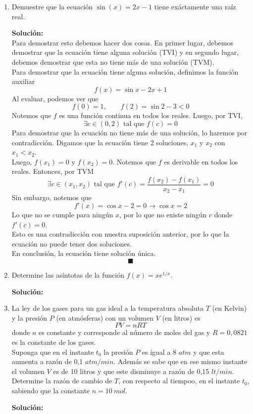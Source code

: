 \documentclass[12pt]{article}
\newenvironment{solucion}
{\begin{mdframed}[backgroundcolor=black!10]
		{\bf Solución:}\\
	}
	{
	\end{mdframed}
}
\newenvironment{preguntas}
{\begin{enumerate}\itemsep12pt
	}
	{
	\end{enumerate}
}
\newcommand{\ra}{\rightarrow}
\begin{document}
\begin{preguntas}
\begin{solucion}
\end{solucion}
\item Demuestre que la ecuación $\sin (x) = 2x-1$ tiene exáctamente una raíz real.
\begin{solucion}
Para demostrar esto debemos hacer dos cosas. En primer lugar, debemos demostrar que la ecuación tiene alguna solución (TVI) y en segundo lugar, debemos demostrar que esta no tiene más de una solución (TVM).\\

Para demostrar que la ecuación tiene alguna solución, definimos la función auxiliar
$$f(x) = \sin x - 2x + 1$$
Al evaluar, podemos ver que
$$f(0) = 1, \qquad f(2) = \sin 2 - 3 < 0$$
Notemos que $f$ es una función continua en todos los reales. Luego, por TVI, 
$$\exists c \in (0,2) \text{ tal que } f(c) = 0$$
Para demostrar que la ecuación no tiene más de una solución, lo haremos por contradicción. Digamos que la ecuación tiene 2 soluciones, $x_1$ y $x_2$ con $x_1 < x_2$.\\

Luego, $f(x_1) = 0$ y $f(x_2) = 0$. Notemos que $f$ es derivable en todos los reales. Entonces, por TVM
$$\exists c \in (x_1, x_2) \text{ tal que } f'(c) = \dfrac{f(x_2) - f(x_1)}{x_2-x_1} = 0$$
Sin embargo, notemos que
$$f'(x) = \cos x - 2 = 0 \ra \cos x = 2$$
Lo que no se cumple para ningún $x$, por lo que no existe ningún $c$ donde $f'(c) = 0$.\\

Esto es una contradicción con nuestra suposición anterior, por lo que la ecuación no puede tener dos soluciones.\\

En conclusión, la ecuación tiene solución única. 
$$\blacksquare$$
\end{solucion}
\item Determine las asíntotas de la función $f(x) = xe^{1/x}$.
\begin{solucion}

\end{solucion}
\item La ley de los gases para un gas ideal a la temperatura absoluta $T$ (en Kelvin) y la presión $P$ (en atmósferas) con un volumen $V$ (en litros) es
$$PV = nRT$$
donde $n$ es constante y corresponde al número de moles del gas y $R = 0,0821$ es la constante de los gases.\\
Suponga que en el instante $t_0$ la presión $P$ es igual a 8 $atm$ y que esta aumenta a razón de 0,1 $atm/min$. Además se sabe que en ese mismo instante el volumen $V$ es de 10 litros y que este disminuye a razón de 0,15 $lt/min$.\\
Determine la razón de cambio de $T$, con respecto al tiempoo, en el instante $t_0$, sabiendo que la constante $n = 10\ mol$.
\begin{solucion}

\end{solucion}
\end{preguntas}
\end{document}
